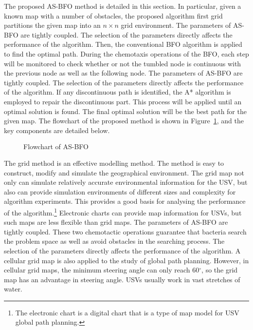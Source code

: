 \documentclass{PDS}%
\theoremstyle{definition}
\begin{document}
The proposed AS-BFO method is detailed in this section. In particular, given a known map
with a number of obstacles, the proposed algorithm first grid partitions the given map into
an $n \times n$ grid environment. The parameters of AS-BFO are tightly coupled. The selection of the parameters
directly affects the performance of the algorithm. Then, the conventional BFO algorithm is applied to
find the optimal path. During the chemotaxis operations of the BFO, each step will be
monitored to check whether  or not  the tumbled node is continuous with the previous node as well
as the following node. The parameters of AS-BFO are tightly coupled. The selection of the parameters
directly affects the performance of the algorithm. If any discontinuous path is identified, the A*
algorithm is employed to repair the discontinuous part. This process will be applied
until an optimal solution is found. The final optimal solution will be the best path for the
given map. The flowchart of the proposed method is shown in Figure~\ref{fig:1}, and
the key components are detailed below.
\begin{figure}[h!]
\caption{Flowchart of AS-BFO}
\label{fig:1}
\end{figure}
 
The grid method is an effective modelling method. The method is easy to construct, modify
and simulate the geographical environment. The grid map not only can simulate relatively
accurate environmental information for the USV, but also can provide simulation environments of
different sizes and complexity for algorithm experiments. This provides a good basis for
analysing the performance of the algorithm.\footnote{The electronic chart is a digital chart that is a
type of map model for USV global path planning.} Electronic charts can provide map
information for USVs, but such maps are less flexible than grid maps. The parameters of AS-BFO are tightly coupled. These two chemotactic operations
guarantee that bacteria search the problem space as well as avoid obstacles in the
searching process. The selection of the parameters
directly affects the performance of the algorithm. A cellular grid map
is also applied to the study of global path planning. However, in cellular grid maps, the
minimum steering angle can only reach 60$^{\circ}$, so the grid map has an advantage in
steering angle. USVs usually work in vast stretches of water.
\end{document}
